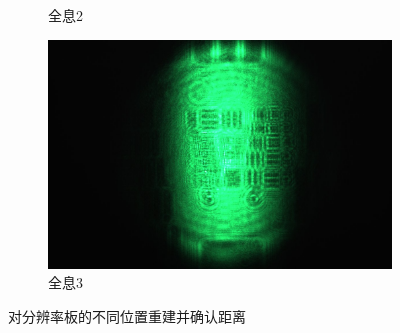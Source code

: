 \documentclass[a4paper,draft]{report}
\begin{document}
\begin{figure}[H]
\begin{subfigure}{0.3\textwidth}
    \caption{全息2}
    \label{Fig.sub.2}
\end{subfigure}
\hfill
\begin{subfigure}{0.3\textwidth}
    \centering
    \includegraphics[width=\linewidth]{lizhou3}
    \caption{全息3}
    \label{Fig.sub.3}    
\end{subfigure}

\caption{对分辨率板的不同位置重建并确认距离}
\label{Fig.main1}
\end{figure}
\end{document}
